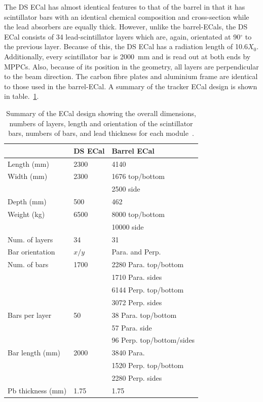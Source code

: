\newline
\newline
The DS ECal has almost identical features to that of the barrel in that it has scintillator bars with an identical chemical composition and cross-section while the lead absorbers are equally thick.  However, unlike the barrel-ECals, the DS ECal consists of 34 lead-scintillator layers which are, again, orientated at 90$^\circ$ to the previous layer.  Because of this, the DS ECal has a radiation length of 10.6$X_0$.  Additionally, every scintillator bar is 2000~mm and is read out at both ends by MPPCs.  Also, because of its position in the geometry, all layers are perpendicular to the beam direction.  The carbon fibre plates and aluminium frame are identical to those used in the barrel-ECal.
\newline
\newline
A summary of the tracker ECal design is shown in table.~\ref{table:ECalDesign}.
\begin{table}
\begin{center}
\begin{tabular}{l|l|l}
\hline
        & DS ECal  &Barrel ECal  \\ \hline
Length (mm)& 2300      & 4140   \\ 
Width (mm)  & 2300      & 1676  top/bottom \\ 
        &          & 2500 side  \\ 
Depth (mm)  & 500     & 462    \\
Weight (kg) & 6500 & 8000 top/bottom  \\
            &      & 10000 side        \\ \hline
Num. of layers &  34      &  31  \\ \hline
Bar orientation & $x/y$ &Para. and Perp. \\ \hline
Num. of bars    & 1700     & 2280 Para. top/bottom  \\ 
        &          & 1710 Para. sides \\     
        &          & 6144 Perp. top/bottom   \\ 
        &          & 3072 Perp. sides       \\ \hline  
Bars per layer & 50 & 38 Para. top/bottom\\
               &    & 57 Para. side\\
               &    & 96 Perp. top/bottom/sides  \\  \hline
Bar length (mm) & 2000  & 3840  Para. \\ 
           &      & 1520 Perp. top/bottom \\ 
           &      & 2280 Perp. sides      \\ \hline
Pb thickness (mm) & 1.75  & 1.75    \\ \hline 
\end{tabular}
\caption{Summary of the ECal design showing the overall dimensions, numbers of layers, length and orientation of the scintillator bars, numbers of bars, and lead thickness for each module~\cite{1748-0221-8-10-P10019}.}
\label{table:ECalDesign} 
\end{center}
\end{table}
